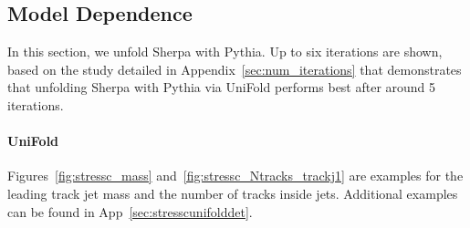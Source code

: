 \clearpage

\subsection{Model Dependence}
\label{sec:modeldep}

In this section, we unfold Sherpa with Pythia. Up to six iterations are shown, based on the study detailed in Appendix~\ref{sec:num_iterations} that demonstrates that unfolding Sherpa with Pythia via UniFold performs best after around 5 iterations. 

\paragraph{UniFold}

Figures~\ref{fig:stressc_mass} and~\ref{fig:stressc_Ntracks_trackj1} are examples for the leading track jet mass and the number of tracks inside jets.  Additional examples can be found in App~\ref{sec:stresscunifolddet}.

\begin{figure}[h!]
\centering
{}\\
\\
\end{figure}

